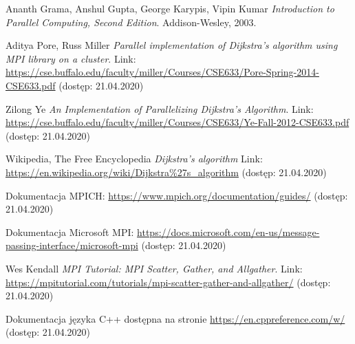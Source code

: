 \documentclass[12pt]{article}
\begin{document}
\newpage
\begin{thebibliography}{9}
Ananth Grama, Anshul Gupta, George Karypis, Vipin Kumar 
\textit{Introduction to Parallel Computing, Second Edition}. 
Addison-Wesley, 2003.

Aditya Pore, Russ Miller
\textit{Parallel implementation of Dijkstra's algorithm using MPI library on a cluster}.
Link: \url{https://cse.buffalo.edu/faculty/miller/Courses/CSE633/Pore-Spring-2014-CSE633.pdf} (dostęp: 21.04.2020)

Zilong Ye
\textit{An Implementation of Parallelizing Dijkstra’s Algorithm}.
Link: \url{https://cse.buffalo.edu/faculty/miller/Courses/CSE633/Ye-Fall-2012-CSE633.pdf} (dostęp: 21.04.2020)

Wikipedia, The Free Encyclopedia
\textit{Dijkstra's algorithm}
Link: \url{https://en.wikipedia.org/wiki/Dijkstra\%27s_algorithm} (dostęp: 21.04.2020)

Dokumentacja MPICH: \url{https://www.mpich.org/documentation/guides/} (dostęp: 21.04.2020)

Dokumentacja Microsoft MPI: \url{https://docs.microsoft.com/en-us/message-passing-interface/microsoft-mpi} (dostęp: 21.04.2020)

Wes Kendall
\textit{MPI Tutorial: MPI Scatter, Gather, and Allgather}.
Link: \url{https://mpitutorial.com/tutorials/mpi-scatter-gather-and-allgather/} (dostęp: 21.04.2020)

Dokumentacja języka C++ dostępna na stronie \url{https://en.cppreference.com/w/} (dostęp: 21.04.2020)


\end{thebibliography}
\end{document}
